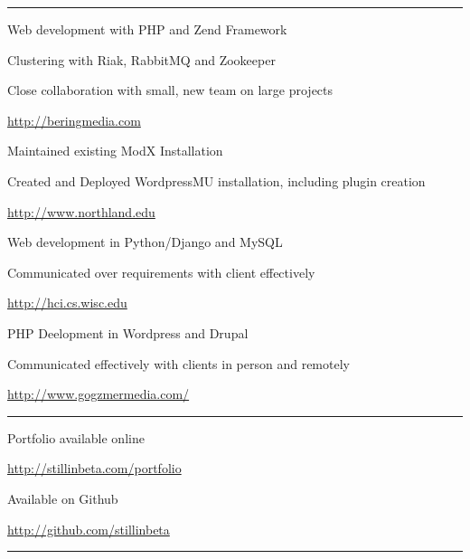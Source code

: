 \documentclass[letterpaper,11pt,notitlepage]{article}
\begin{document}

\rule[1mm]{\linewidth}{0.25mm}
        \begin{employment}
            \item Web development with PHP and Zend Framework
            \item Clustering with Riak, RabbitMQ and
            Zookeeper
            \item Close collaboration with small, new team on large  projects
            \item \url{http://beringmedia.com}
        \end{employment}
        \begin{employment}
            \item Maintained existing ModX Installation
            \item Created and Deployed WordpressMU installation, including plugin creation
            \item \url{http://www.northland.edu}
        \end{employment}
        \begin{employment}
            \item Web development in Python/Django and MySQL
            \item Communicated over requirements with client effectively
            \item \url{http://hci.cs.wisc.edu}
        \end{employment}
        \begin{employment}
            \item PHP Deelopment in Wordpress and Drupal
            \item Communicated effectively with clients in person and remotely
            \item \url{http://www.gogzmermedia.com/}
        \end{employment}
\rule[1mm]{\linewidth}{0.25mm}
        \begin{employment}
            \item Portfolio available online
            \item \url{http://stillinbeta.com/portfolio}
        \end{employment}
        \begin{employment}
            \item Available on Github
            \item \url{http://github.com/stillinbeta}
        \end{employment}
\rule[1mm]{\linewidth}{0.25mm}
\end{document}
